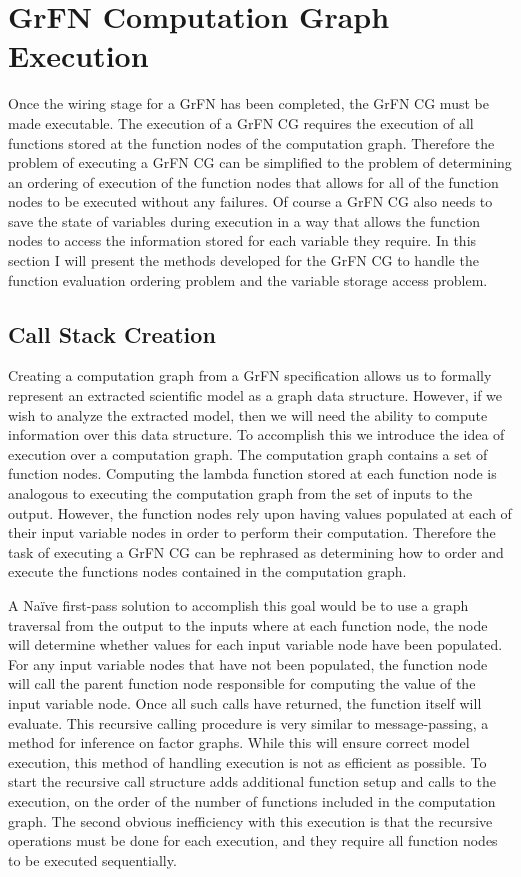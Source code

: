 \section{GrFN Computation Graph Execution\label{sec:cg_execution}}
Once the wiring stage for a GrFN has been completed, the GrFN CG must be made executable. The execution of a GrFN CG requires the execution of all functions stored at the function nodes of the computation graph. Therefore the problem of executing a GrFN CG can be simplified to the problem of determining an ordering of execution of the function nodes that allows for all of the function nodes to be executed without any failures. Of course a GrFN CG also needs to save the state of variables during execution in a way that allows the function nodes to access the information stored for each variable they require. In this section I will present the methods developed for the GrFN CG to handle the function evaluation ordering problem and the variable storage access problem.

\subsection{Call Stack Creation\label{sec:call_stack}}
Creating a computation graph from a GrFN specification allows us to formally represent an extracted scientific model as a graph data structure.
However, if we wish to analyze the extracted model, then we will need the ability to compute information over this data structure.
To accomplish this we introduce the idea of execution over a computation graph. The computation graph contains a set of function nodes.
Computing the lambda function stored at each function node is analogous to executing the computation graph from the set of inputs to the output.
However, the function nodes rely upon having values populated at each of their input variable nodes in order to perform their computation.
Therefore the task of executing a GrFN CG can be rephrased as determining how to order and execute the functions nodes contained in the computation graph.

A Naïve first-pass solution to accomplish this goal would be to use a graph traversal from the output to the inputs where at each function node, the node will determine whether values for each input variable node have been populated.
For any input variable nodes that have not been populated, the function node will call the parent function node responsible for computing the value of the input variable node.
Once all such calls have returned, the function itself will evaluate. This recursive calling procedure is very similar to message-passing, a method for inference on factor graphs.
While this will ensure correct model execution, this method of handling execution is not as efficient as possible.
To start the recursive call structure adds additional function setup and calls to the execution, on the order of the number of functions included in the computation graph.
The second obvious inefficiency with this execution is that the recursive operations must be done for each execution, and they require all function nodes to be executed sequentially.

